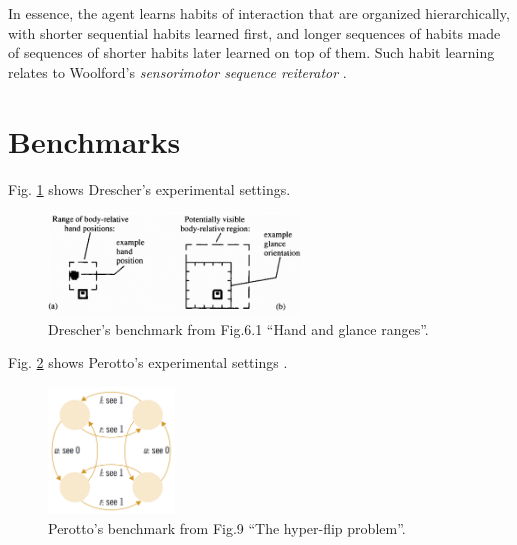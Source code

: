 \documentclass[runningheads]{llncs}
\begin{document}
In essence, the agent learns habits of interaction that are organized hierarchically, with shorter sequential habits learned first, and longer sequences of habits made of sequences of shorter habits later learned on top of them. 
Such habit learning relates to Woolford's \textit{sensorimotor sequence reiterator} \cite{woolford_precarious_2020}.

\section{Benchmarks}
\label{sec:benchmarks}

Fig. \ref{fig:drescher2} shows Drescher's experimental settings.


\begin{figure}
	\centering
	\includegraphics[width=0.6\textwidth]{Figure_drescher_expe.png}
	\caption{Drescher's benchmark from \cite{drescher_made-up_1991} Fig.6.1 ``Hand and glance ranges''.} 
	\label{fig:drescher2}
\end{figure}

Fig. \ref{fig:perotto_ben} shows Perotto's experimental settings \cite{perotto_computational_nodate}.


\begin{figure}
	\centering
	\includegraphics[width=0.3\textwidth]{Figure_perotto_benchmark.png}
	\caption{Perotto's benchmark from \cite{perotto_computational_nodate} Fig.9 ``The hyper-flip problem''.} 
	\label{fig:perotto_ben}
\end{figure}
\end{document}
